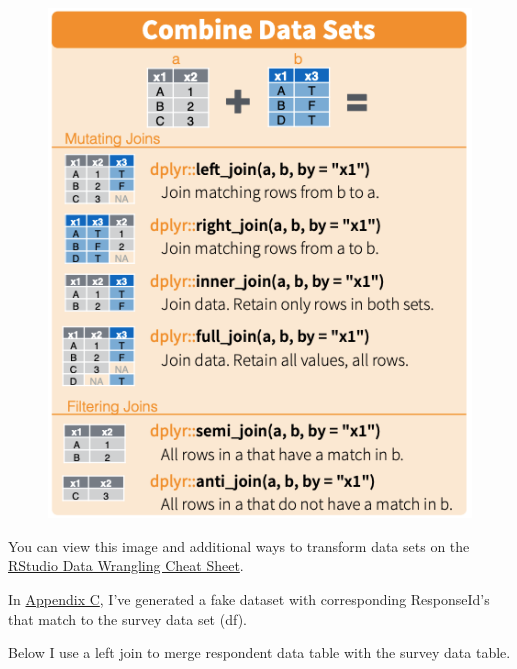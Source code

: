 \documentclass[]{book}
\newenvironment{Shaded}{\begin{snugshade}}{\end{snugshade}}
\newcommand{\KeywordTok}[1]{\textcolor[rgb]{0.13,0.29,0.53}{\textbf{#1}}}
\newcommand{\DataTypeTok}[1]{\textcolor[rgb]{0.13,0.29,0.53}{#1}}
\newcommand{\StringTok}[1]{\textcolor[rgb]{0.31,0.60,0.02}{#1}}
\newcommand{\CommentTok}[1]{\textcolor[rgb]{0.56,0.35,0.01}{\textit{#1}}}
\newcommand{\OperatorTok}[1]{\textcolor[rgb]{0.81,0.36,0.00}{\textbf{#1}}}
\newcommand{\NormalTok}[1]{#1}
\begin{document}
\begin{figure}
\centering
\includegraphics{figs/combine_datasets.png}
\caption{}
\end{figure}

You can view this image and additional ways to transform data sets on
the
\href{https://www.rstudio.com/wp-content/uploads/2015/02/data-wrangling-cheatsheet.pdf}{RStudio
Data Wrangling Cheat Sheet}.

In \protect\hyperlink{appendixC}{Appendix C}, I've generated a fake
dataset with corresponding ResponseId's that match to the survey data
set (df).

Below I use a left join to merge respondent data table with the survey
data table.

\begin{Shaded}
\end{Shaded}
\end{document}
